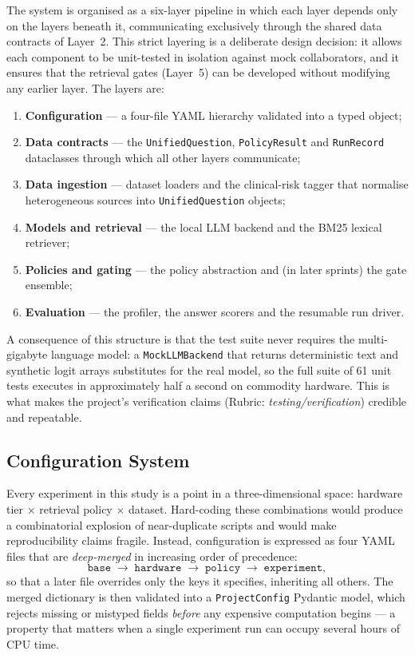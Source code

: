 The system is organised as a six-layer pipeline in which each layer depends
only on the layers beneath it, communicating exclusively through the shared
data contracts of Layer~2. This strict layering is a deliberate design
decision: it allows each component to be unit-tested in isolation against
mock collaborators, and it ensures that the retrieval gates (Layer~5) can be
developed without modifying any earlier layer. The layers are:

\begin{enumerate}
  \item \textbf{Configuration} --- a four-file YAML hierarchy validated into a
        typed object;
  \item \textbf{Data contracts} --- the \texttt{UnifiedQuestion},
        \texttt{PolicyResult} and \texttt{RunRecord} dataclasses through which
        all other layers communicate;
  \item \textbf{Data ingestion} --- dataset loaders and the clinical-risk
        tagger that normalise heterogeneous sources into
        \texttt{UnifiedQuestion} objects;
  \item \textbf{Models and retrieval} --- the local LLM backend and the BM25
        lexical retriever;
  \item \textbf{Policies and gating} --- the policy abstraction and (in later
        sprints) the gate ensemble;
  \item \textbf{Evaluation} --- the profiler, the answer scorers and the
        resumable run driver.
\end{enumerate}

A consequence of this structure is that the test suite never requires the
multi-gigabyte language model: a \texttt{MockLLMBackend} that returns
deterministic text and synthetic logit arrays substitutes for the real model,
so the full suite of 61 unit tests executes in approximately half a second on
commodity hardware. This is what makes the project's verification claims
(Rubric: \emph{testing/verification}) credible and repeatable.

\subsection{Configuration System}
\label{sec:impl-config}

Every experiment in this study is a point in a three-dimensional space:
hardware tier $\times$ retrieval policy $\times$ dataset. Hard-coding these
combinations would produce a combinatorial explosion of near-duplicate
scripts and would make reproducibility claims fragile. Instead, configuration
is expressed as four YAML files that are \emph{deep-merged} in increasing
order of precedence:
\[
  \texttt{base} \;\rightarrow\; \texttt{hardware} \;\rightarrow\;
  \texttt{policy} \;\rightarrow\; \texttt{experiment},
\]
so that a later file overrides only the keys it specifies, inheriting all
others. The merged dictionary is then validated into a \texttt{ProjectConfig}
Pydantic model, which rejects missing or mistyped fields \emph{before} any
expensive computation begins --- a property that matters when a single
experiment run can occupy several hours of CPU time.

